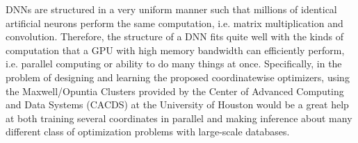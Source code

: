 \documentclass[a4paper, 11pt]{article}
\begin{document}
DNNs are structured in a very uniform manner such that millions of identical artificial neurons perform the same computation, i.e. matrix multiplication and convolution.   Therefore, the structure of a DNN fits quite well with the kinds of computation that a GPU with high memory bandwidth can efficiently perform, i.e. parallel computing or ability to do many things at once. Specifically, in the problem of designing and learning the proposed coordinatewise optimizers, using the Maxwell/Opuntia Clusters provided by the Center of Advanced Computing and Data Systems (CACDS) at the University of Houston would be a great help at both training  several coordinates in parallel and making inference about many different class of optimization problems with large-scale databases.

\pagebreak


\end{document}
